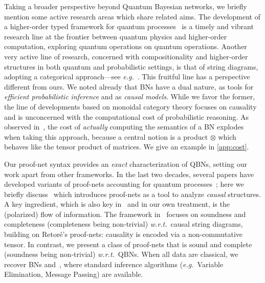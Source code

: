 \documentclass[10pt,a4paper]{article}
\newcommand*{\eg}{\emph{e.g.}\xspace}
\newcommand*{\wrt}{\emph{w.r.t.}}
\newcommand*{\QBNs}{Quantum Bayesian networks\xspace}
\begin{document}
Taking a broader perspective beyond \QBNs, we briefly mention some active research areas which share related aims. 
The development of a higher-order typed framework for quantum processes~\cite{10.1098/rspa.2018.0706,10.22331/q-2026-01-21-1978} is a timely and vibrant research line at the frontier between quantum physics and higher-order computation, exploring quantum operations on quantum operations.
Another very active line of research, concerned with compositionality and higher-order structures in both quantum and probabilistic settings, is that of string diagrams, adopting a categorical approach---see \eg~\cite{10.23638/LMCS-15(3:15)2019,10.4230/LIPIcs.MFCS.2022.80, simmons2024completelogiccausalconsistency}.
This fruitful line has a perspective different from ours.
We noted already that BNs have a dual nature, as tools for \emph{efficient probabilistic inference} and as \emph{causal models}.
While we favor the former, the line of developments based on monoidal category theory focuses on causality and is unconcerned with the computational cost of probabilistic reasoning.
As observed in~\cite[Example~9.7]{popl24}, the cost of \emph{actually} computing the semantics of a BN explodes when taking this approach, because a central notion is a product $\otimes$ which behaves like the tensor product of matrices.
We give an example in \cref{app:cost}. 

Our proof-net syntax provides an \emph{exact} characterization of QBNs, setting our work apart from other frameworks.
In the last two decades, several papers have developed variants of proof-nets accounting for quantum processes~\cite{DuncanThesis,AbramskyDuncan2009GeneralisedProofNets,esop2014,LagoFVY17,simmons2024completelogiccausalconsistency}; here we briefly discuss~\cite{simmons2024completelogiccausalconsistency} which introduces proof-nets as a tool to analyze \emph{causal} structures.
A key ingredient, which is also key in~\cite{popl24} and in our own treatment, is the (polarized) flow of information.
The framework in~\cite{simmons2024completelogiccausalconsistency} focuses on soundness and completeness (completeness being non‑trivial) \wrt\ causal string diagrams, building on Retoré’s proof-nets: causality is encoded via a non‑commutative tensor.
In contrast, we present a class of proof‑nets that is sound and complete (soundness being non‑trivial) \wrt\ QBNs.
When all data are classical, we recover BNs and~\cite{BPN}, where standard inference algorithms (\eg\ Variable Elimination, Message Passing) are available.
\end{document}
